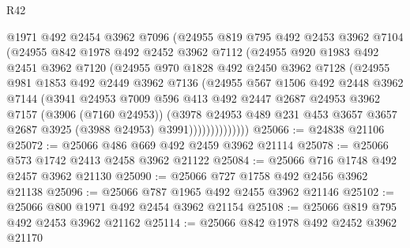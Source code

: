 \begin{lexlean}{R42}
\begin{coremodule}
                @1971
                @492
                @2454
                @3962
                @7096
                (@24955
                  @819
                  @795
                  @492
                  @2453
                  @3962
                  @7104
                  (@24955
                    @842
                    @1978
                    @492
                    @2452
                    @3962
                    @7112
                    (@24955
                      @920
                      @1983
                      @492
                      @2451
                      @3962
                      @7120
                      (@24955
                        @970
                        @1828
                        @492
                        @2450
                        @3962
                        @7128
                        (@24955
                          @981
                          @1853
                          @492
                          @2449
                          @3962
                          @7136
                          (@24955
                            @567
                            @1506
                            @492
                            @2448
                            @3962
                            @7144
                            (@3941
                              @24953
                              @7009
                              @596
                              @413
                              @492
                              @2447
                              @2687
                              @24953
                              @3962
                              @7157
                              (@3906 (@7160 @24953))
                              (@3978
                                @24953
                                @489
                                @231
                                @453
                                @3657
                                @3657
                                @2687
                                @3925
                                (@3988 @24953)
                                @3991))))))))))))))
@25066 := @24838 @21106
@25072 := @25066 @486 @669 @492 @2459 @3962 @21114
@25078 := @25066 @573 @1742 @2413 @2458 @3962 @21122
@25084 := @25066 @716 @1748 @492 @2457 @3962 @21130
@25090 := @25066 @727 @1758 @492 @2456 @3962 @21138
@25096 := @25066 @787 @1965 @492 @2455 @3962 @21146
@25102 := @25066 @800 @1971 @492 @2454 @3962 @21154
@25108 := @25066 @819 @795 @492 @2453 @3962 @21162
@25114 := @25066 @842 @1978 @492 @2452 @3962 @21170

\end{coremodule}
\end{lexlean}
